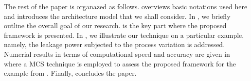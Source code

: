 The rest of the paper is organazed as follows.  overviews basic notations used here and introduces the architecture model that we shall consider. In , we briefly outline the overall goal of our research.  is the key part where the proposed framework is presented. In , we illustrate our technique on a particular example, namely, the leakage power subjected to the process variation is addressed. Numerial results in terms of computational speed and accuracy are given in  where a MCS technique is employed to assess the proposed framework for the example from . Finally,  concludes the paper.
